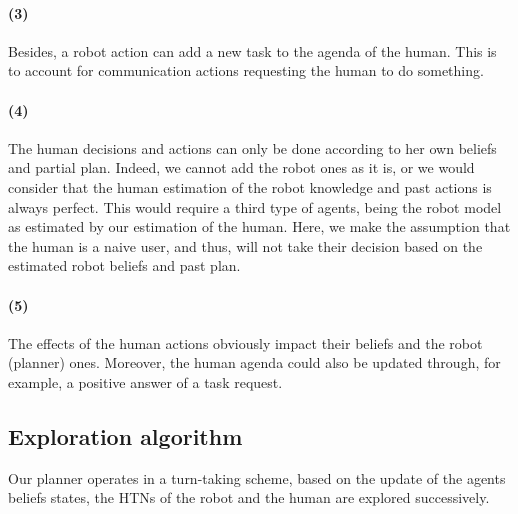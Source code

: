 \documentclass[a4paper,11pt,twoside]{StyleThese}
\begin{document}
\paragraph{(3)} Besides, a robot action can add a new task to the agenda of the human. This is to account for communication actions requesting the human to do something.

\paragraph{(4)} The human decisions and actions can only be done according to her own beliefs and partial plan. Indeed, we cannot add the robot ones as it is, or we would consider that the human estimation of the robot knowledge and past actions is always perfect. This would require a third type of agents, being the robot model as estimated by our estimation of the human. Here, we make the assumption that the human is a naive user, and thus, will not take their decision based on the estimated robot beliefs and past plan.

\paragraph{(5)}The effects of the human actions obviously impact their beliefs and the robot (planner) ones. Moreover, the human agenda could also be updated through, for example, a positive answer of a task request.


\subsection{Exploration algorithm}
Our planner operates in a turn-taking scheme, based on the update of the agents beliefs states, the HTNs of the robot and the human are explored successively.
\end{document}
